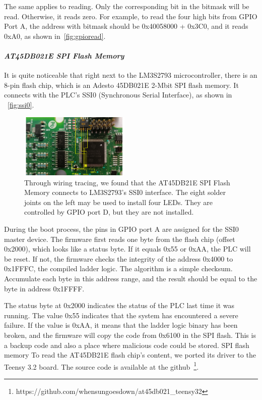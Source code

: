 The same applies to reading. Only the corresponding bit in the bitmask will be read. Otherwise, it reads zero. For example, to read the four high bits from GPIO Port A, the address with bitmask should be 0x40058000 + 0x3C0, and it reads 0xA0, as shown in~\autoref{fig:gpioread}.


\paragraph{\textbf{\textit{AT45DB021E SPI Flash Memory}}}  It is quite noticeable that right next to the LM3S2793 microcontroller,  there is an 8-pin flash chip, which is an Adesto 45DB021E 2-Mbit SPI flash memory. It connects with the PLC's SSI0 (Synchronous Serial Interface), as shown in ~\autoref{fig:ssi0}.

\begin{figure}[tp!]
	\includegraphics[width=0.47\textwidth]{figures/ssi0}
	\centering
	\caption{Through wiring tracing, we found that the AT45DB21E SPI Flash Memory connects to LM3S2793's SSI0 interface. The eight solder joints on the left may be used to install four LEDs. They are controlled by GPIO port D,  but they are not installed.}
	\label{fig:ssi0}
\end{figure}


During the boot process, the pins in GPIO port A are assigned for the SSI0 master device. The firmware first reads one byte from the flash chip (offset 0x2000), which looks like a status byte. If it equals 0x55 or 0xAA, the PLC will be reset. If not, the firmware checks the integrity of the address 0x4000 to 0x1FFFC, the compiled ladder logic. The algorithm is a simple checksum. Accumulate each byte in this address range, and the result should be equal to the byte in address 0x1FFFF.

The status byte at 0x2000 indicates the status of the PLC last time it was running. The value 0x55 indicates that the system has encountered a severe failure. %
If the value is 0xAA, it means that the ladder logic binary has been broken, and the firmware will copy the code from 0x6100 in the SPI flash. This is a backup code and also a place where malicious code could be stored. SPI flash memory
To read the AT45DB21E flash chip's content, we ported its driver to the Teensy 3.2 board. The source code is available at the github~\footnote{https://github.com/whensungoesdown/at45db021\_teensy32}.

